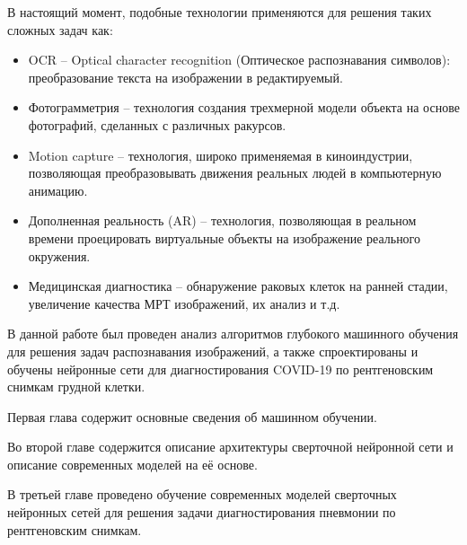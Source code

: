 В настоящий момент, подобные технологии применяются для решения таких сложных задач как:
\begin{itemize}
    \item OCR – Optical character recognition (Оптическое распознавания символов): преобразование текста на изображении в редактируемый.
    \item Фотограмметрия – технология создания трехмерной модели объекта на основе фотографий, сделанных с различных ракурсов.
    \item Motion capture – технология, широко применяемая в киноиндустрии, позволяющая преобразовывать движения реальных людей в компьютерную анимацию.
    \item Дополненная реальность (AR) – технология, позволяющая в реальном времени проецировать виртуальные объекты на изображение реального окружения. 
    \item Медицинская диагностика – обнаружение раковых клеток на ранней стадии, увеличение качества МРТ изображений, их анализ и т.д.
\end{itemize}

В данной работе был проведен анализ алгоритмов глубокого машинного обучения для решения задач распознавания изображений, а также спроектированы и обучены нейронные сети для диагностирования COVID-19 по рентгеновским снимкам грудной клетки. 

Первая глава содержит основные сведения об машинном обучении.

Во второй главе содержится описание архитектуры сверточной нейронной сети и описание современных моделей на её основе. 

В третьей главе проведено обучение современных моделей сверточных нейронных сетей для решения задачи диагностирования пневмонии по рентгеновским снимкам.

\clearpage